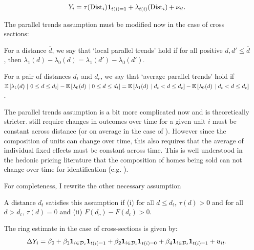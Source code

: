 \documentclass[10pt]{article}
\newcommand{\dist}{\text{Dist}}
\begin{document}
\begin{equation}\label{eq:model_rc}
    Y_{i} = \tau(\dist_i) \one_{t(i) = 1} + \lambda_{t(i)}(\dist_i) + \nu_{it}.  
\end{equation}

The parallel trends assumption must be modified now in the case of cross sections:

\begin{assumption}\label{assum:parallel_rc}
    For a distance $\bar{d}$, we say that `local parallel trends' hold if for all positive $d, d' \leq \bar{d}$, then $\lambda_1(d) - \lambda_0(d) = \lambda_1(d') - \lambda_0(d')$.
\end{assumption}

\begin{assumption}\label{assum:parallel_weak_rc}
    For a pair of distances $d_t$ and $d_c$, we say that `average parallel trends' hold if $\mathbb{E}\left[\lambda_1(d) \ \vert \ 0 \leq d \leq d_t\right] - \mathbb{E}\left[\lambda_0(d) \ \vert \ 0 \leq d \leq d_t\right] = \mathbb{E}\left[\lambda_1(d) \ \vert \ d_t < d \leq d_c\right] - \mathbb{E}\left[\lambda_0(d) \ \vert \ d_t < d \leq d_c\right]$.
\end{assumption}

The parallel trends assumption is a bit more complicated now and is theoretically stricter.  still require changes in outcomes over time for a given unit $i$ must be constant across distance (or on average in the case of ). However since the composition of units can change over time, this also requires that the average of individual fixed effects must be constant across time. This is well understood in the hedonic pricing literature that the composition of homes being sold can not change over time for identification (e.g. \citet{Linden_Rockoff_2008}).

For completeness, I rewrite the other necessary assumption
\begin{assumption}[Correct $d_t$]\label{assum:dt_repeated}
    A distance $d_t$ satisfies this assumption if (i) for all $d \leq d_t$, $\tau(d) > 0$ and for all $d > d_t$, $\tau(d) = 0$ and (ii) $F(d_c) - F(d_t) > 0$.
\end{assumption}

The ring estimate in the case of cross-sections is given by:
\begin{equation}\label{eq:ring_method}
    \Delta Y_{i} = \beta_0 + \beta_1 \mathbf{1}_{i \in \mathcal{D}_c} \mathbf{1}_{t(i) = 1} + \beta_2 \mathbf{1}_{i \in \mathcal{D}_t} \mathbf{1}_{t(i) = 0} + \beta_4 \mathbf{1}_{i \in \mathcal{D}_t} \mathbf{1}_{t(i) = 1} + u_{it}.
\end{equation}
\end{document}
